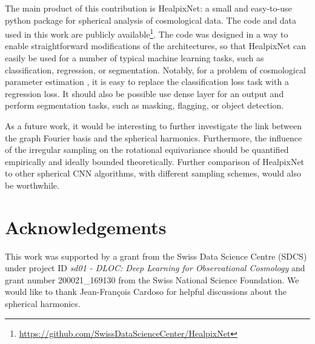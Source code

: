 \documentclass[final,twocolumn,3p,times,authoryear]{elsarticle}
\newcommand{\nati}[1]{{\color[rgb]{.1,.6,.1}{#1}}}
\newcommand{\TK}[1]{{\color{red}{TK:#1}}}
\newcommand{\1}{\b{1}}              %
\newcommand{\0}{\b{0}}              %
\begin{document}
The main product of this contribution is HealpixNet: a small and easy-to-use python package for spherical analysis of cosmological data.
The code and data used in this work are publicly available\footnote{\url{https://github.com/SwissDataScienceCenter/HealpixNet}}.
The code was designed in a way to enable straightforward modifications of the architectures, so that HealpixNet can easily be used for a number of typical machine learning tasks, such as classification, regression, or segmentation.
Notably, for a problem of cosmological parameter estimation \citep{fluri2018deep,gupta2018nongaussianinformation}, it is easy to replace the classification loss task with a regression loss.
It should also be possible use dense layer for an output and perform segmentation tasks, such as masking, flagging, or object detection.

As a future work, it would be interesting to further investigate the link between the graph Fourier basis and the spherical harmonics. Furthermore, the influence of the irregular sampling on the rotational equivariance should be quantified empirically and ideally bounded theoretically.
Further comparison of HealpixNet to other spherical CNN algorithms, with different sampling schemes, would also be worthwhile.


\section*{Acknowledgements}

This work was supported by a grant from the Swiss Data Science Centre (SDCS) under project ID \textit{sd01 - DLOC:  Deep Learning for Observational Cosmology} and grant number 200021\_169130 from the Swiss National Science Foundation.
\nati{@Tomek: do we need to thank Janis?}
We would like to thank Jean-François Cardoso for helpful discussions about the spherical harmonics.

\appendix
\end{document}
